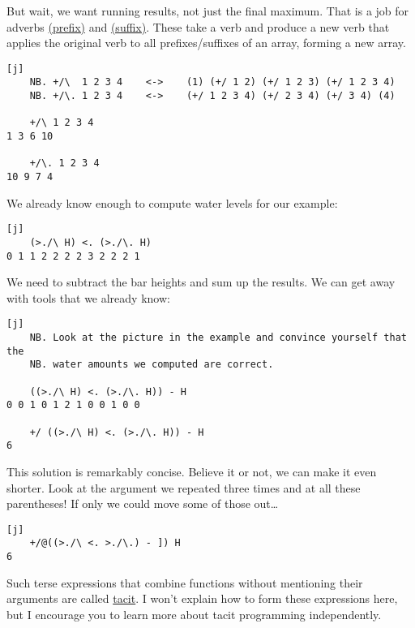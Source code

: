 \documentclass{article}
\begin{document}
But wait, we want running results, not just the final maximum.
That is a job for adverbs \href{https://code.jsoftware.com/wiki/Vocabulary/bslash}{\code{\\} (prefix)} and \href{https://code.jsoftware.com/wiki/Vocabulary/bslashdot}{ (suffix)}.
These take a verb and produce a new verb that applies the original verb to all prefixes/suffixes of an array, forming a new array.

\begin{verbatim}[j]
    NB. +/\  1 2 3 4    <->    (1) (+/ 1 2) (+/ 1 2 3) (+/ 1 2 3 4)
    NB. +/\. 1 2 3 4    <->    (+/ 1 2 3 4) (+/ 2 3 4) (+/ 3 4) (4)

    +/\ 1 2 3 4
1 3 6 10

    +/\. 1 2 3 4
10 9 7 4
\end{verbatim}

We already know enough to compute water levels for our example:

\begin{verbatim}[j]
    (>./\ H) <. (>./\. H)
0 1 1 2 2 2 2 3 2 2 2 1
\end{verbatim}

We need to subtract the bar heights and sum up the results.
We can get away with tools that we already know:

\begin{verbatim}[j]
    NB. Look at the picture in the example and convince yourself that the
    NB. water amounts we computed are correct.

    ((>./\ H) <. (>./\. H)) - H
0 0 1 0 1 2 1 0 0 1 0 0

    +/ ((>./\ H) <. (>./\. H)) - H
6
\end{verbatim}

This solution is remarkably concise.
Believe it or not, we can make it even shorter.
Look at the argument we repeated three times and at all these parentheses!
If only we could move some of those out\ldots

\begin{verbatim}[j]
    +/@((>./\ <. >./\.) - ]) H
6
\end{verbatim}

Such terse expressions that combine functions without mentioning their arguments are called \href{https://www.jsoftware.com/help/jforc/tacit_programs.htm}{tacit}.
I won't explain how to form these expressions here, but I encourage you to learn more about tacit programming independently.
\end{document}
